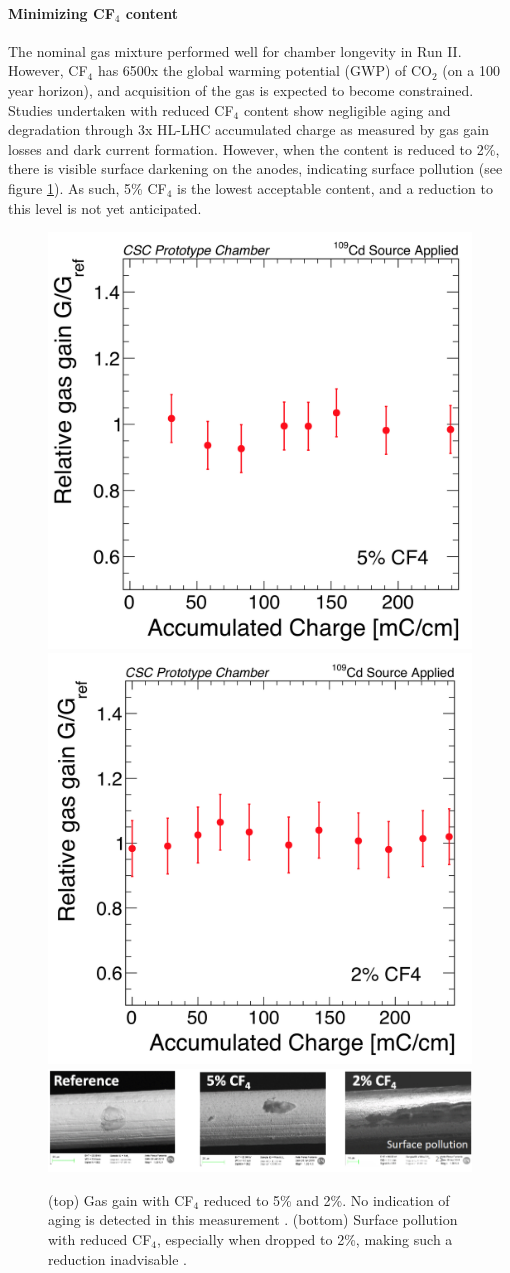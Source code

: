 \documentclass[a4paper,11pt]{article}
\begin{document}
\paragraph{Minimizing CF$_4$ content}
The nominal gas mixture performed well for chamber longevity in Run II. However, CF$_4$ has 6500x the global warming potential (GWP) of CO$_2$ (on a 100 year horizon), and acquisition of the gas is expected to become constrained. Studies undertaken with reduced CF$_4$ content show negligible aging and degradation through 3x HL-LHC accumulated charge as measured by gas gain losses and dark current formation. However, when the content is reduced to 2\%, there is visible surface darkening on the anodes, indicating surface pollution (see figure \ref{fig:PerformanceCF4Reduced}). As such, 5\% CF$_4$ is the lowest acceptable content, and a reduction to this level is not yet anticipated.
\begin{figure}[htbp]
\centering %
\includegraphics[width=.45\textwidth]{CSC-CF4-5Percent.png}
\qquad
\includegraphics[width=.46\textwidth]{CSC-CF4-2Percent.png}
\qquad
\includegraphics[width=.9\textwidth]{Pollution.png}
\caption{\label{fig:PerformanceCF4Reduced} (top) Gas gain with CF$_4$ reduced to 5\% and 2\%. No indication of aging is detected in this measurement \cite{reduction}. (bottom) Surface pollution with reduced CF$_4$, especially when dropped to 2\%, making such a reduction inadvisable \cite{reduction}.}
\end{figure}
\end{document}
